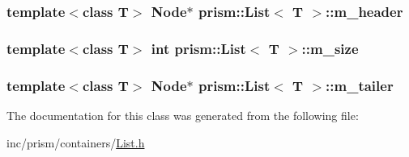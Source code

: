 \subsubsection[{\texorpdfstring{m\+\_\+header}{m_header}}]{\setlength{\rightskip}{0pt plus 5cm}template$<$class T$>$ Node$\ast$ {\bf prism\+::\+List}$<$ T $>$\+::m\+\_\+header\hspace{0.3cm}{\ttfamily [protected]}}\hypertarget{classprism_1_1_list_ade9dd1234d468fdcbcddb16eb490d296}{}\label{classprism_1_1_list_ade9dd1234d468fdcbcddb16eb490d296}
\subsubsection[{\texorpdfstring{m\+\_\+size}{m_size}}]{\setlength{\rightskip}{0pt plus 5cm}template$<$class T$>$ int {\bf prism\+::\+List}$<$ T $>$\+::m\+\_\+size\hspace{0.3cm}{\ttfamily [protected]}}\hypertarget{classprism_1_1_list_ae86f48e50ec12239597de98deb36b4a4}{}\label{classprism_1_1_list_ae86f48e50ec12239597de98deb36b4a4}
\subsubsection[{\texorpdfstring{m\+\_\+tailer}{m_tailer}}]{\setlength{\rightskip}{0pt plus 5cm}template$<$class T$>$ Node$\ast$ {\bf prism\+::\+List}$<$ T $>$\+::m\+\_\+tailer\hspace{0.3cm}{\ttfamily [protected]}}\hypertarget{classprism_1_1_list_a0740989f0d5af2bad19850fac850947e}{}\label{classprism_1_1_list_a0740989f0d5af2bad19850fac850947e}


The documentation for this class was generated from the following file\+:\begin{DoxyCompactItemize}
\item 
inc/prism/containers/\hyperlink{_list_8h}{List.\+h}\end{DoxyCompactItemize}
